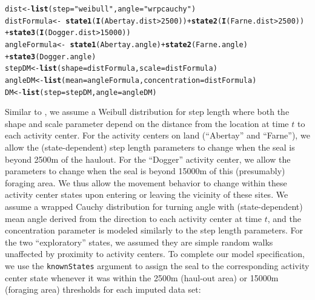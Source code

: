 \documentclass[12pt]{article}\usepackage[]{graphicx}\usepackage[]{xcolor}
\makeatletter
\newcommand{\hlnum}[1]{\textcolor[rgb]{0.686,0.059,0.569}{#1}}%
\newcommand{\hlsng}[1]{\textcolor[rgb]{0.192,0.494,0.8}{#1}}%
\newcommand{\hlopt}[1]{\textcolor[rgb]{0,0,0}{#1}}%
\newcommand{\hldef}[1]{\textcolor[rgb]{0.345,0.345,0.345}{#1}}%
\newcommand{\hlkwb}[1]{\textcolor[rgb]{0.69,0.353,0.396}{#1}}%
\newcommand{\hlkwc}[1]{\textcolor[rgb]{0.333,0.667,0.333}{#1}}%
\newcommand{\hlkwd}[1]{\textcolor[rgb]{0.737,0.353,0.396}{\textbf{#1}}}%
\newenvironment{kframe}{%
 \def\at@end@of@kframe{}%
 \ifinner\ifhmode%
  \def\at@end@of@kframe{\end{minipage}}%
  \begin{minipage}{\columnwidth}%
 \fi\fi%
 \def\FrameCommand##1{\hskip\@totalleftmargin \hskip-\fboxsep
 \colorbox{shadecolor}{##1}\hskip-\fboxsep
     \hskip-\linewidth \hskip-\@totalleftmargin \hskip\columnwidth}%
 \MakeFramed {\advance\hsize-\width
   \@totalleftmargin\z@ \linewidth\hsize
   \@setminipage}}%
 {\par\unskip\endMakeFramed%
 \at@end@of@kframe}
\newenvironment{knitrout}{}{} %
\makeatother
\begin{document}
\begin{knitrout}
\color{fgcolor}\begin{kframe}
\begin{alltt}
\hldef{dist} \hlkwb{<-} \hlkwd{list}\hldef{(}\hlkwc{step} \hldef{=} \hlsng{"weibull"}\hldef{,} \hlkwc{angle} \hldef{=} \hlsng{"wrpcauchy"}\hldef{)}
\hldef{distFormula} \hlkwb{<-} \hlopt{~}\hlkwd{state1}\hldef{(}\hlkwd{I}\hldef{(Abertay.dist}\hlopt{>}\hlnum{2500}\hldef{))} \hlopt{+} \hlkwd{state2}\hldef{(}\hlkwd{I}\hldef{(Farne.dist}\hlopt{>}\hlnum{2500}\hldef{))}
                  \hlopt{+} \hlkwd{state3}\hldef{(}\hlkwd{I}\hldef{(Dogger.dist}\hlopt{>}\hlnum{15000}\hldef{))}
\hldef{angleFormula} \hlkwb{<-} \hlopt{~}\hlkwd{state1}\hldef{(Abertay.angle)} \hlopt{+} \hlkwd{state2}\hldef{(Farne.angle)}
                  \hlopt{+} \hlkwd{state3}\hldef{(Dogger.angle)}
\hldef{stepDM} \hlkwb{<-} \hlkwd{list}\hldef{(}\hlkwc{shape} \hldef{= distFormula,} \hlkwc{scale} \hldef{= distFormula)}
\hldef{angleDM} \hlkwb{<-} \hlkwd{list}\hldef{(}\hlkwc{mean} \hldef{= angleFormula,} \hlkwc{concentration} \hldef{= distFormula)}
\hldef{DM} \hlkwb{<-} \hlkwd{list}\hldef{(}\hlkwc{step} \hldef{= stepDM,} \hlkwc{angle} \hldef{= angleDM)}
\end{alltt}
\end{kframe}
\end{knitrout}
Similar to \cite{McClintockEtAl2012}, we assume a Weibull distribution for step length where both the shape and scale parameter depend on the distance from the location at time $t$ to each activity center. For the activity centers on land (``Abertay'' and ``Farne''), we allow the (state-dependent) step length parameters to change when the seal is beyond 2500m of the haulout. For the ``Dogger'' activity center, we allow the parameters to change when the seal is beyond 15000m of this (presumably) foraging area. We thus allow the movement behavior to change within these activity center states upon entering or leaving the vicinity of these sites.  We assume a wrapped Cauchy distribution for turning angle with (state-dependent) mean angle derived from the direction to each activity center at time $t$, and the concentration parameter is modeled similarly to the step length parameters. For the two ``exploratory'' states, we assumed they are simple random walks unaffected by proximity to activity centers. To complete our model specification, we use the \verb|knownStates| argument to assign the seal to the corresponding activity center state whenever it was within the 2500m (haul-out area) or 15000m (foraging area) thresholds for each imputed data set:
\end{document}
